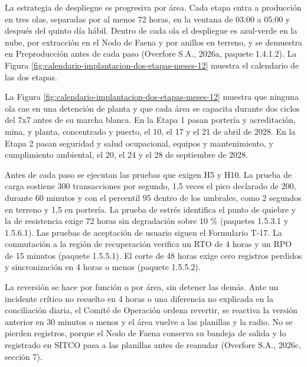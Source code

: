 \documentclass[subdoc]{../../comun/overfore}
\begin{document}
La estrategia de despliegue es progresiva por área. Cada etapa entra a producción en tres olas, separadas por al menos 72 horas, en la ventana de 03:00 a 05:00 y después del quinto día hábil. Dentro de cada ola el despliegue es azul-verde en la nube, por extracción en el Nodo de Faena y por anillos en terreno, y se demuestra en Preproducción antes de cada paso (Overfore S.A., 2026a, paquete 1.4.1.2). La Figura \ref{fig:calendario-implantacion-dos-etapas-meses-12} muestra el calendario de las dos etapas.

La Figura \ref{fig:calendario-implantacion-dos-etapas-meses-12} muestra que ninguna ola cae en una detención de planta y que cada área se capacita durante dos ciclos del 7x7 antes de su marcha blanca. En la Etapa 1 pasan portería y acreditación, mina, y planta, concentrado y puerto, el 10, el 17 y el 21 de abril de 2028. En la Etapa 2 pasan seguridad y salud ocupacional, equipos y mantenimiento, y cumplimiento ambiental, el 20, el 24 y el 28 de septiembre de 2028.

Antes de cada paso se ejecutan las pruebas que exigen H5 y H10. La prueba de carga sostiene 300 transacciones por segundo, 1,5 veces el pico declarado de 200, durante 60 minutos y con el percentil 95 dentro de los umbrales, como 2 segundos en terreno y 1,5 en portería. La prueba de estrés identifica el punto de quiebre y la de resistencia exige 72 horas sin degradación sobre 10 \% (paquetes 1.5.3.1 y 1.5.6.1). Las pruebas de aceptación de usuario siguen el Formulario T-17. La conmutación a la región de recuperación verifica un RTO de 4 horas y un RPO de 15 minutos (paquete 1.5.5.1). El corte de 48 horas exige cero registros perdidos y sincronización en 4 horas o menos (paquete 1.5.5.2).

La reversión se hace por función o por área, sin detener las demás. Ante un incidente crítico no resuelto en 4 horas o una diferencia no explicada en la conciliación diaria, el Comité de Operación ordena revertir, se reactiva la versión anterior en 30 minutos o menos y el área vuelve a las planillas y la radio. No se pierden registros, porque el Nodo de Faena conserva su bandeja de salida y lo registrado en SITCO pasa a las planillas antes de reanudar (Overfore S.A., 2026c, sección 7).
\end{document}
